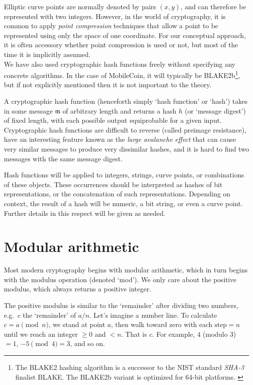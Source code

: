 Elliptic curve points are normally denoted by pairs \((x, y)\), and can therefore be represented with two integers. However, in the world of cryptography, it is common to apply {\em point compression} techniques that allow a point to be represented using only the space of one coordinate. For our conceptual approach, it is often accessory whether point compression is used or not, but most of the time it is implicitly assumed.\\

We have also used cryptographic hash functions freely without specifying any concrete algorithms. In the case of MobileCoin, it will typically be BLAKE2b\footnote{The BLAKE2 hashing algorithm is a successor to the NIST standard {\em SHA-3} \cite{nist-sha3} finalist BLAKE. The BLAKE2b variant is optimized for 64-bit platforms. \cite{blake2-paper}}, but if not explicitly mentioned then it is not important to the theory. 

A cryptographic hash function (henceforth simply `hash function' or `hash') takes in some message $\mathfrak{m}$ of arbitrary length and returns a hash $h$ (or `message digest') of fixed length, with each possible output equiprobable for a given input. Cryptographic hash functions are difficult to reverse (called preimage resistance), have an interesting feature known as the {\em large avalanche effect} that can cause very similar messages to produce very dissimilar hashes, and it is hard to find two messages with the same message digest.

Hash functions will be applied to integers, strings, curve points, or combinations of these objects. These occurrences should be interpreted as hashes of bit representations, or the concatenation of such representations. Depending on context, the result of a hash will be numeric, a bit string, or even a curve point. Further details in this respect will be given as needed.



\section{Modular arithmetic}
\label{sec:modular-arithmetic}

Most modern cryptography begins with modular arithmetic, which in turn begins with the modulus operation (denoted `mod'). We only care about the positive modulus, which always returns a positive integer.

The positive modulus is similar to the `remainder' after dividing two numbers, e.g.\ $c$ the `remainder' of $a/n$. Let's imagine a number line. To calculate $c = a \pmod n$, we stand at point $a$, then walk toward zero with each $\text{step} = n$ until we reach an integer $\geq{0}$ and $< n$. That is $c$. For example, $4$ (modulo 3) $= 1$, $-5 \pmod 4 = 3$, and so on.

